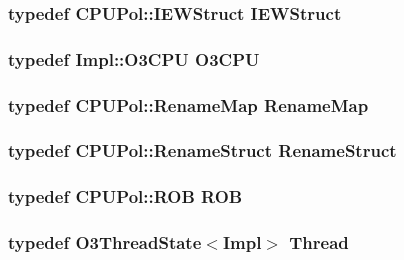 \label{classDefaultCommit_a2e298f790f528754f0e0ffa0cb8088f6}
\hypertarget{classDefaultCommit_a7cf3f052f760b3a8a18623f792c10910}{
\subsubsection[{IEWStruct}]{\setlength{\rightskip}{0pt plus 5cm}typedef CPUPol::IEWStruct {\bf IEWStruct}}}
\label{classDefaultCommit_a7cf3f052f760b3a8a18623f792c10910}
\hypertarget{classDefaultCommit_a44622cf06940413482836cb62931ac3f}{
\subsubsection[{O3CPU}]{\setlength{\rightskip}{0pt plus 5cm}typedef Impl::O3CPU {\bf O3CPU}}}
\label{classDefaultCommit_a44622cf06940413482836cb62931ac3f}
\hypertarget{classDefaultCommit_a341963bcea1928476182a17e357f98e3}{
\subsubsection[{RenameMap}]{\setlength{\rightskip}{0pt plus 5cm}typedef CPUPol::RenameMap {\bf RenameMap}}}
\label{classDefaultCommit_a341963bcea1928476182a17e357f98e3}
\hypertarget{classDefaultCommit_a0c2a89ad2edad9ad605d0461f9b132a5}{
\subsubsection[{RenameStruct}]{\setlength{\rightskip}{0pt plus 5cm}typedef CPUPol::RenameStruct {\bf RenameStruct}}}
\label{classDefaultCommit_a0c2a89ad2edad9ad605d0461f9b132a5}
\hypertarget{classDefaultCommit_aa480e463fb139d9966f38e3895a8b326}{
\subsubsection[{ROB}]{\setlength{\rightskip}{0pt plus 5cm}typedef CPUPol::ROB {\bf ROB}}}
\label{classDefaultCommit_aa480e463fb139d9966f38e3895a8b326}
\hypertarget{classDefaultCommit_ad5e0f9b655492f45720f8d756f11d3b5}{
\subsubsection[{Thread}]{\setlength{\rightskip}{0pt plus 5cm}typedef {\bf O3ThreadState}$<$Impl$>$ {\bf Thread}}}
